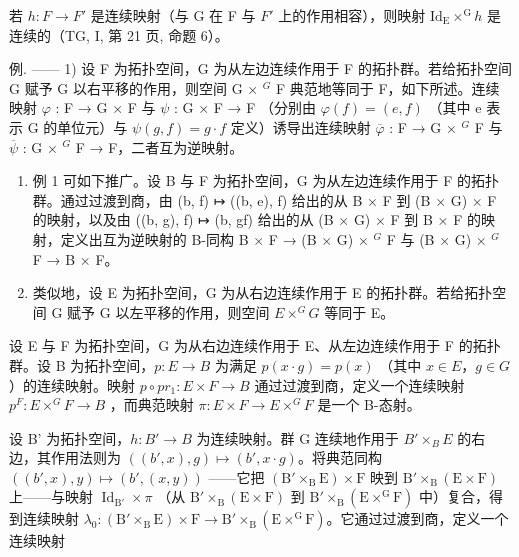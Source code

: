 若 \(h \colon F \to F'\) 是连续映射（与 G 在 F 与 \(F'\) 上的作用相容），则映射 \(\mathrm{Id}_{\mathrm{E}} \times^{\mathrm{G}} h\) 是连续的（TG, I, 第 21 页, 命题 6）。

例. —— 1) 设 F 为拓扑空间，G 为从左边连续作用于 F 的拓扑群。若给拓扑空间 G 赋予 G 以右平移的作用，则空间 G × \(^{G}\) F 典范地等同于 F，如下所述。连续映射 \(\varphi\) : F → G × F 与 \(\psi\) : G × F → F （分别由 \(\varphi(f) = (e, f)\) （其中 e 表示 G 的单位元）与 \(\psi(g, f) = g \cdot f\) 定义）诱导出连续映射 \(\overline{\varphi}\) : F → G × \(^{G}\) F 与 \(\overline{\psi}\) : G × \(^{G}\) F → F，二者互为逆映射。

\begin{enumerate}
\def\labelenumi{\arabic{enumi})}
\setcounter{enumi}{1}
\item
  例 1 可如下推广。设 B 与 F 为拓扑空间，G 为从左边连续作用于 F 的拓扑群。通过过渡到商，由 (b, f) ↦ ((b, e), f) 给出的从 B × F 到 (B × G) × F 的映射，以及由 ((b, g), f) ↦ (b, gf) 给出的从 (B × G) × F 到 B × F 的映射，定义出互为逆映射的 B-同构 B × F → (B × G) × \(^{G}\) F 与 (B × G) × \(^{G}\) F → B × F。
\item
  类似地，设 E 为拓扑空间，G 为从右边连续作用于 E 的拓扑群。若给拓扑空间 G 赋予 G 以左平移的作用，则空间 \(E \times^{G} G\) 等同于 E。
\end{enumerate}

设 E 与 F 为拓扑空间，G 为从右边连续作用于 E、从左边连续作用于 F 的拓扑群。设 B 为拓扑空间，\(p\colon E \to B\) 为满足 \(p(x \cdot g) = p(x)\) （其中 \(x \in E\)，\(g \in G\)）的连续映射。映射 \(p \circ pr_{1}\colon E \times F \to B\) 通过过渡到商，定义一个连续映射 \(p^{F}\colon E \times^{G} F \to B\) ，而典范映射 \(\pi\colon E \times F \to E \times^{G} F\) 是一个 B-态射。

设 B' 为拓扑空间，\(h\colon B'\to B\) 为连续映射。群 G 连续地作用于 \(B'\times_{B}E\) 的右边，其作用法则为 \(((b',x),g)\mapsto(b',x\cdot g)\)。将典范同构 \(((b',x),y)\mapsto(b',(x,y))\) ——它把 \((\mathrm{B}'\times_{\mathrm{B}}\mathrm{E})\times\mathrm{F}\) 映到 \(\mathrm{B}'\times_{\mathrm{B}}(\mathrm{E}\times\mathrm{F})\) 上——与映射 \(\operatorname{Id}_{\mathrm{B}'}\times\pi\) （从 \(\mathrm{B}'\times_{\mathrm{B}}(\mathrm{E}\times\mathrm{F})\) 到 \(\mathrm{B}'\times_{\mathrm{B}}(\mathrm{E}\times^{\mathrm{G}}\mathrm{F})\) 中）复合，得到连续映射 \(\lambda_{0}\colon(\mathrm{B}'\times_{\mathrm{B}}\mathrm{E})\times\mathrm{F}\to\mathrm{B}'\times_{\mathrm{B}}(\mathrm{E}\times^{\mathrm{G}}\mathrm{F})\)。它通过过渡到商，定义一个连续映射

